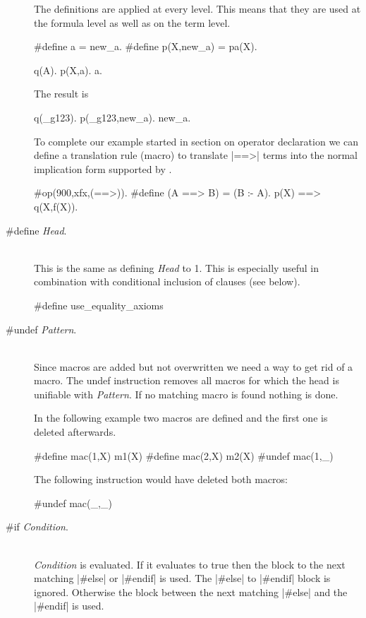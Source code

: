 \begin{description}
  The definitions are applied at every level. This means that they are used at
  the formula level as well as on the term level.

\begin{BoxedSample}
  \#define a = new\_a.
  \#define p(X,new\_a) = pa(X).

  q(A).
  p(X,a).
  a.
\end{BoxedSample}
  The result is
\begin{BoxedSample}
  q(\_g123).
  p(\_g123,new\_a).
  new\_a.
\end{BoxedSample}

  To complete our example started in section on operator declaration we can
  define a translation rule (macro) to translate |==>| terms into the normal
  implication form supported by \ProTop.

\begin{BoxedSample}
  \#op(900,xfx,(==>)).
  \#define (A ==> B) = (B :- A).
  p(X) ==> q(X,f(X)).
\end{BoxedSample}

\item [\#define {\em Head}.]\ \\
  This is the same as defining {\em Head}\/ to 1. This is especially useful in
  combination with conditional inclusion of clauses (see below).

\begin{BoxedSample}
  \#define use\_equality\_axioms
\end{BoxedSample}

\item [\#undef {\em Pattern}.]\ \\
  Since macros are added but not overwritten we need a way to get rid of a
  macro. The undef instruction removes all macros for which the head is
  unifiable with {\em Pattern}. If no matching macro is found nothing is done.

  In the following example two macros are defined and the first one is deleted
  afterwards. 
\begin{BoxedSample}
  \#define mac(1,X) m1(X)
  \#define mac(2,X) m2(X)
  \#undef mac(1,\_)
\end{BoxedSample}
  The following instruction would have deleted both macros:
\begin{BoxedSample}
  \#undef mac(\_,\_)
\end{BoxedSample}

\item [\#if {\em Condition}.]\ \\
  {\em Condition}\/ is evaluated. If it evaluates to true then the block to
  the next matching |#else| or |#endif| is used. The |#else| to |#endif| block
  is ignored. Otherwise the block between the next matching |#else| and the
  |#endif| is used.


\end{description}
